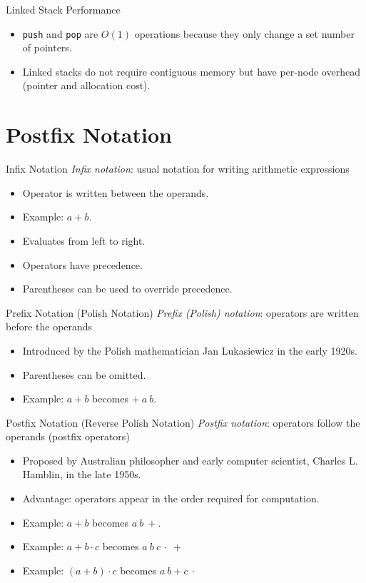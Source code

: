 \documentclass[14pt,aspectratio=1610]{beamer}
\begin{document}
\begin{frame}{Linked Stack Performance}
\begin{itemize}[<+->]
\item
  \lstinline{push} and \lstinline{pop} are \(O(1)\) operations because they only change a set number of pointers.
\item
  Linked stacks do not require contiguous memory but have per-node overhead
  (pointer and allocation cost).
\end{itemize}
\end{frame}

\section{Postfix Notation}

\begin{frame}{Infix Notation}
\emph{Infix notation}: usual notation for writing arithmetic expressions
\begin{itemize}[<+->]
\item
  Operator is written between the operands.
\item
  Example: \(a + b\).
\item
  Evaluates from left to right.
\item
  Operators have precedence.
\item
  Parentheses can be used to override precedence.
\end{itemize}
\end{frame}

\begin{frame}{Prefix Notation (Polish Notation)}
\emph{Prefix (Polish) notation}: operators are written before the operands
\begin{itemize}
\item
  Introduced by the Polish mathematician Jan Lukasiewicz in the early 1920s.
\item
  Parentheses can be omitted.
\item
  Example: \(a + b\) becomes \(+\ a\ b\).
\end{itemize}
\end{frame}

\begin{frame}{Postfix Notation (Reverse Polish Notation)}
\emph{Postfix notation}: operators follow the operands (postfix operators)

\begin{itemize}
\item
  Proposed by Australian philosopher and early computer scientist, Charles L. Hamblin, in the late 1950s.
\item
  Advantage: operators appear in the order required for computation.
\item
  Example: \(a + b\) becomes \(a\ b\ + \).
\item
  Example: \(a + b \cdot c\) becomes \(a\ b\ c\ \cdot\ + \)
\item
  Example: \((a + b) \cdot c\) becomes \(a\ b + c\ \cdot \)
\end{itemize}
\end{frame}
\end{document}
